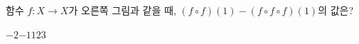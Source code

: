 \hspace*{2mm}\begin{minipage}[t]{\dimexpr\linewidth-2mm\relax}\vspace{0pt}
\noindent\begin{minipage}[t]{0.58\linewidth}\vspace{0pt}\raggedright 함수 $f:X\longrightarrow X$가 오른쪽 그림과 같을 때, $(f\circ f)(1)-(f\circ f\circ f)(1)$의 값은?\end{minipage}\hfill\begin{minipage}[t]{0.4\linewidth}\vspace{0pt}\centering \resizebox{\ifdim\width>\linewidth\linewidth\else\width\fi}{!}{}\end{minipage}\par
\begin{choicesii}{$-2$}{$-1$}{$1$}{$2$}{$3$}\end{choicesii}\end{minipage}
